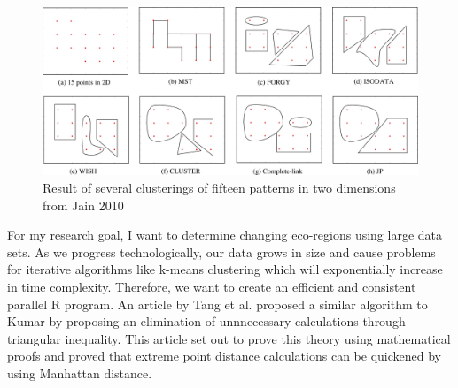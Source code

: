 \documentclass[a4paper,10pt]{article}
\begin{document}
\begin{figure}[h!]
    \caption{Result of several clusterings of fifteen patterns in two dimensions from Jain 2010 \cite{jain2010data}}
    \centering
    \includegraphics[scale=0.7]{clustering_differences.jpg}
\end{figure}

For my research goal, I want to determine changing eco-regions using large data sets. As we progress technologically, our data 
grows in size and cause problems for iterative algorithms like k-means clustering which will exponentially increase in time 
complexity. Therefore, we want to create an efficient and consistent parallel R program. \cite{tierney2008snow} An article by Tang et al. 
proposed a similar algorithm to Kumar by proposing an elimination of unnnecessary calculations through triangular inequality. 
This article set out to prove this theory using mathematical proofs and proved that extreme point distance calculations can be quickened 
by using Manhattan distance. \cite{tang2017parallel}




\end{document}
